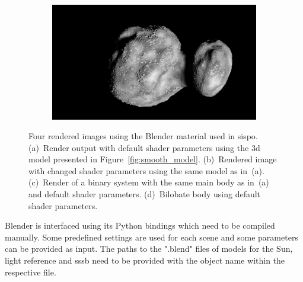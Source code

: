 \begin{figure}[htb]
\begin{subfigure}[b]{0.47\textwidth}
        \caption{}
        \label{fig:render_out_main_moon}
    \end{subfigure}
    \begin{subfigure}[b]{0.47\textwidth}
        \centering
        \includegraphics[width=\textwidth]{doc/thesis/0_figures/procedural_terrain/bilobe2.png}
        \caption{}
        \label{fig:render_out_bilobe}
    \end{subfigure}
    \caption{Four rendered images using the Blender material used in \gls{sispo}. (a)~Render output with default shader parameters using the \gls{3d} model presented in Figure~\ref{fig:smooth_model}. (b)~Rendered image with changed shader parameters using the same model as in~(a). (c)~Render of a binary system with the same main body as in~(a) and default shader parameters. (d)~Bilobate body using default shader parameters.}
    \label{fig:render_out}
\end{figure}
Blender is interfaced using its Python bindings which need to be compiled manually. Some predefined settings are used for each scene and some parameters can be provided as input. The paths to the ".blend" files of models for the Sun, light reference and \gls{sssb} need to be provided with the object name within the respective file.

